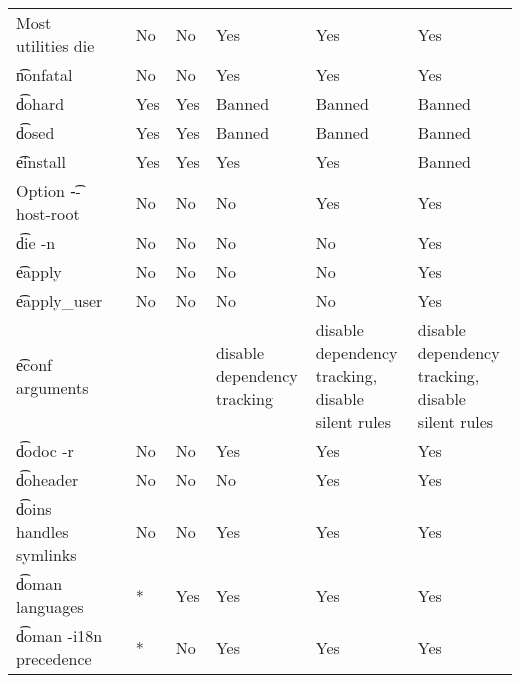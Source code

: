 \begin{landscape}
\begin{longtable}{llP{7.5em}P{7.5em}P{7.5em}P{7.5em}P{7.5em}}
Most utilities die &  &
    No & No & Yes & Yes & Yes \\

\t{nonfatal} &  &
    No & No & Yes & Yes & Yes \\

\t{dohard} &  &
    Yes & Yes & Banned & Banned & Banned \\

\t{dosed} &  &
    Yes & Yes & Banned & Banned & Banned \\

\t{einstall} &  &
    Yes & Yes & Yes & Yes & Banned \\

Option \t{-{}-host-root} &  &
    No & No & No & Yes & Yes \\

\t{die -n} &  &
    No & No & No & No & Yes \\

\t{eapply} &  &
    No & No & No & No & Yes \\

\t{eapply\_user} &  &
    No & No & No & No & Yes \\

\t{econf} arguments &  &
    &  & disable dependency tracking &
    disable dependency tracking, disable silent rules &
    disable dependency tracking, disable silent rules \\

\t{dodoc -r} &  &
    No & No & Yes & Yes & Yes \\

\t{doheader} &  &
    No & No & No & Yes & Yes \\

\t{doins} handles symlinks &  &
    No & No & Yes & Yes & Yes \\

\t{doman} languages &  &
    * & Yes & Yes & Yes & Yes \\

\t{doman -i18n} precedence &  &
    * & No & Yes & Yes & Yes \\


\end{longtable}
\end{landscape}
